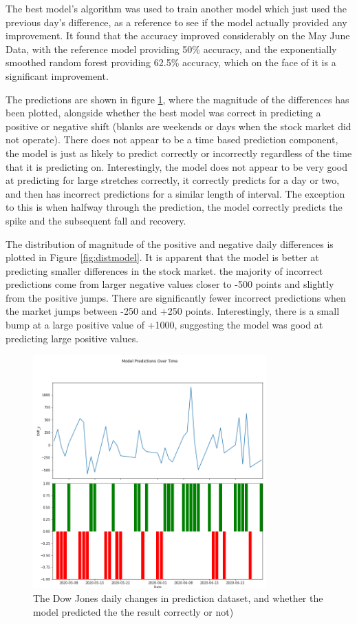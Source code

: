 The best model's algorithm was used to train another model which just used the previous day's difference, as a reference to see if the model actually provided any improvement. It found that the accuracy improved considerably on the May June Data, with the reference model providing 50\% accuracy, and the exponentially smoothed random forest providing 62.5\% accuracy, which on the face of it is a significant improvement. 

The predictions are shown in figure \ref{fig:modelpred}, where the magnitude of the differences has been plotted, alongside whether the best model was correct in predicting a positive or negative shift (blanks are weekends or days when the stock market did not operate). There does not appear to be a time based prediction component, the model is just as likely to predict correctly or incorrectly regardless of the time that it is predicting on. Interestingly, the model does not appear to be very good at predicting for large stretches correctly, it correctly predicts for a day or two, and then has incorrect predictions for a similar length of interval. The exception to this is when halfway through the prediction, the model correctly predicts the spike and the subsequent fall and recovery. 

The distribution of magnitude of the positive and negative daily differences is plotted in Figure \ref{fig:distmodel}.  It is apparent that the model is better at predicting smaller differences in the stock market. the majority of incorrect predictions come from larger negative values closer to -500 points and slightly from the positive jumps. There are significantly fewer incorrect predictions when the market jumps between -250 and +250 points. Interestingly, there is a small bump at a large positive value of +1000, suggesting the model was good at predicting large positive values. 

\begin{figure}[H]
	\centering
	\includegraphics[width=0.8\textwidth]{images/model_pred_time.png}
	\caption{The Dow Jones daily changes in prediction dataset, and whether the model predicted the the result correctly or not)}
	\label{fig:modelpred}
\end{figure}


